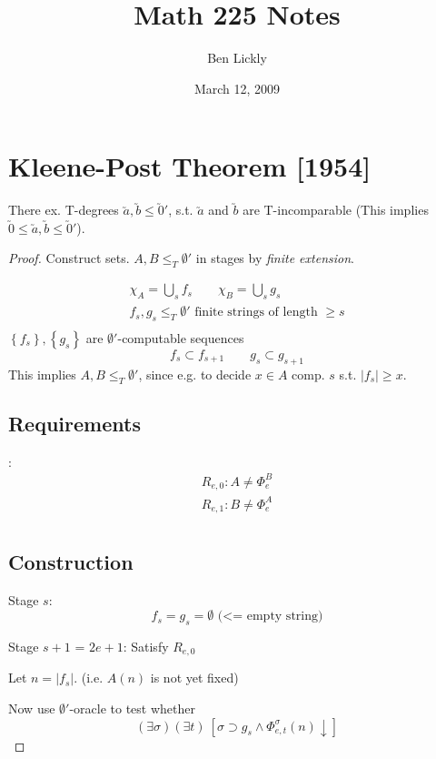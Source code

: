 \documentclass[12pt]{article}
\author{Ben Lickly}
\date{March 12, 2009}
\title{Math 225 Notes}
\begin{document}
\maketitle

\section*{Kleene-Post Theorem [1954]}
There ex. T-degrees $\utilde{a},\utilde{b} \le \utilde{0}'$, s.t.
$\utilde{a}$ and $\utilde{b}$ are T-incomparable 
(This implies
$\utilde{0} \le \utilde{a},\utilde{b} \le \utilde{0}'$).

\begin{proof}
  Construct sets. $A, B \le_T \emptyset'$
  in stages by \emph{finite extension}.

\begin{align*}
  \chi_A = \bigcup_s f_s \qquad \chi_B = \bigcup_s g_s \\
  f_s, g_s \le_T \emptyset' \text{ finite strings of length $\ge s$} \\
\end{align*}
$\left\{f_s\right\}, \left\{g_s\right\}$ are $\emptyset'$-computable sequences
\[
f_s \subset f_{s+1} \qquad 
g_s \subset g_{s+1}
\]
This implies $A, B \le_T \emptyset'$, since e.g. to decide $x \in A$ comp. $s$ s.t. $|f_s| \ge x$.

\subsection*{Requirements}:
\begin{align*}
  R_{e,0}: A \ne \Phi^B_e \\
  R_{e,1}: B \ne \Phi^A_e \\
\end{align*}

\subsection*{Construction}
 Stage $s$: \[
 f_s = g_s = \emptyset \text{ (<= empty string)}
 \]

 Stage $s+1$ = $2e + 1$: Satisfy $R_{e,0}$

 Let $n = |f_s|$. (i.e. $A(n)$ is not yet fixed)

 Now use $\emptyset'$-oracle to test whether
 \begin{equation}
   (\exists \sigma)(\exists t)\ [\sigma \supset g_s \wedge \Phi^\sigma_{e,t}(n) \downarrow]
   \label{star}
 \end{equation}


\end{proof}
\end{document}
